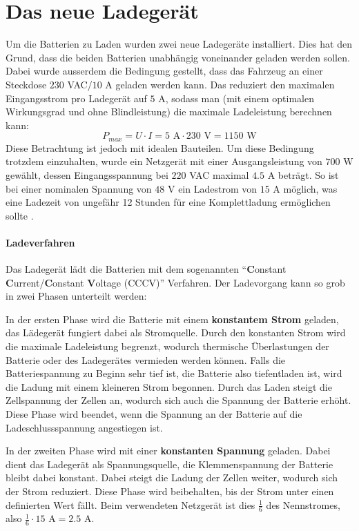 \section{Das neue Ladegerät}
Um die Batterien zu Laden wurden zwei neue Ladegeräte installiert. Dies hat den Grund, dass die beiden Batterien unabhängig voneinander geladen werden sollen. Dabei wurde ausserdem die Bedingung gestellt, dass das Fahrzeug an einer Steckdose $230$ VAC/$10$ A geladen werden kann. Das reduziert den maximalen Eingangsstrom pro Ladegerät auf $5$ A, sodass man (mit einem optimalen Wirkungsgrad und ohne Blindleistung) die maximale Ladeleistung berechnen kann:
\begin{equation*}
	P_{max}=U\cdot I=5\text{ A}\cdot230\text{ V}=1150\text{ W}
\end{equation*}
Diese Betrachtung ist jedoch mit idealen Bauteilen. Um diese Bedingung trotzdem einzuhalten, wurde ein Netzgerät mit einer Ausgangsleistung von $700$ W gewählt, dessen Eingangsspannung bei $220$ VAC maximal $4.5$ A beträgt. So ist bei einer nominalen Spannung von $48$ V ein Ladestrom von $15$ A möglich, was eine Ladezeit von ungefähr 12 Stunden für eine Komplettladung ermöglichen sollte \cite{ladegeraet}.

\paragraph{Ladeverfahren}
Das Ladegerät lädt die Batterien mit dem sogenannten "`\textbf{C}onstant \textbf{C}urrent/\textbf{C}onstant \textbf{V}oltage (CCCV)"' Verfahren. Der Ladevorgang kann so grob in zwei Phasen unterteilt werden:

In der ersten Phase wird die Batterie mit einem \textbf{konstantem Strom} geladen, das Lädegerät fungiert dabei als Stromquelle. Durch den konstanten Strom wird die maximale Ladeleistung begrenzt, wodurch thermische Überlastungen der Batterie oder des Ladegerätes vermieden werden können. Falls die Batteriespannung zu Beginn sehr tief ist, die Batterie also tiefentladen ist, wird die Ladung mit einem kleineren Strom begonnen. Durch das Laden steigt die Zellspannung der Zellen an, wodurch sich auch die Spannung der Batterie erhöht. Diese Phase wird beendet, wenn die Spannung an der Batterie auf die Ladeschlussspannung angestiegen ist.

In der zweiten Phase wird mit einer \textbf{konstanten Spannung} geladen. Dabei dient das Ladegerät als Spannungsquelle, die Klemmenspannung der Batterie bleibt dabei konstant. Dabei steigt die Ladung der Zellen weiter, wodurch sich der Strom reduziert. Diese Phase wird beibehalten, bis der Strom unter einen definierten Wert fällt. Beim verwendeten Netzgerät ist dies $\frac{1}{6}$ des Nennstromes, also $\frac{1}{6}\cdot 15\text{ A}=2.5\text{ A}$.

